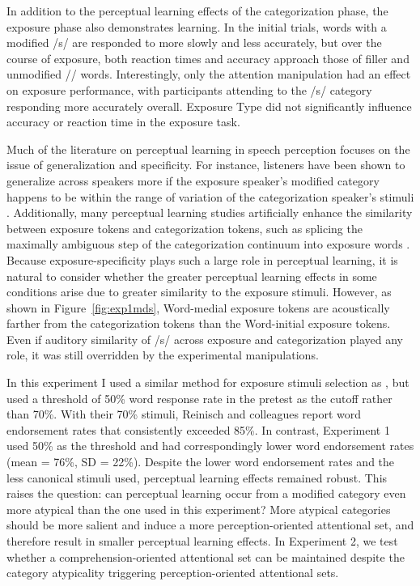 In addition to the perceptual learning effects of the categorization phase, the exposure phase also demonstrates learning.  
In the initial trials, words with a modified /s/ are responded to more slowly and less accurately, but over the course of exposure, both reaction times and accuracy approach those of filler and unmodified /\textesh/ words.
Interestingly, only the attention manipulation had an effect on exposure performance, with participants attending to the /s/ category responding more accurately overall.
Exposure Type did not significantly influence accuracy or reaction time in the exposure task.

Much of the literature on perceptual learning in speech perception focuses on the issue of generalization and specificity.
For instance, listeners have been shown to generalize across speakers more if the exposure speaker's modified category happens to be within the range of variation of the categorization speaker's stimuli \citep{Eisner2005,Kraljic2005}.
Additionally, many perceptual learning studies artificially enhance the similarity between exposure tokens and categorization tokens, such as splicing the maximally ambiguous step of the categorization continuum into exposure words \citep{Norris2003}.
Because exposure-specificity plays such a large role in perceptual learning, it is natural to consider whether the greater perceptual learning effects in some conditions arise due to greater similarity to the exposure stimuli.
However, as shown in Figure~\ref{fig:exp1mds}, Word-medial exposure tokens are acoustically farther from the categorization tokens than the Word-initial exposure tokens.  
Even if auditory similarity of /s/ across exposure and categorization played any role, it was still overridden by the experimental manipulations.

In this experiment I used a similar method for exposure stimuli selection as \citet{Reinisch2013}, but used a threshold of 50\% word response rate in the pretest as the cutoff rather than 70\%.
With their 70\% stimuli, Reinisch and colleagues report word endorsement rates that consistently exceeded 85\%.
In contrast, Experiment 1 used 50\% as the threshold and had correspondingly lower word endorsement rates (mean = 76\%, SD = 22\%).  
Despite the lower word endorsement rates and the less canonical stimuli used, perceptual learning effects remained robust.
This raises the question: can perceptual learning occur from a modified category even more atypical than the one used in this experiment?
More atypical categories should be more salient and induce a more perception-oriented attentional set, and therefore result in smaller perceptual learning effects.
In Experiment 2, we test whether a comprehension-oriented attentional set can be maintained despite the category atypicality triggering perception-oriented attentional sets.

